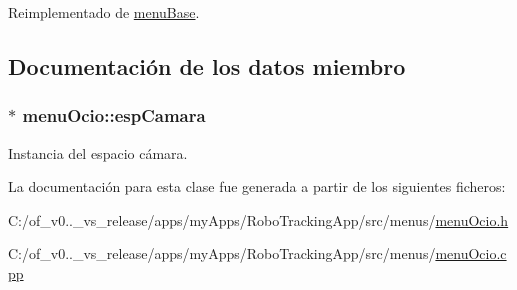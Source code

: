Reimplementado de \hyperlink{classmenu_base_a8d6e8078f62721431e095cb50bbcf40e}{menu\+Base}.



\subsection{Documentación de los datos miembro}
\hypertarget{classmenu_ocio_af1c1c7ca2a0d3f3006f30d89c8edab31}{}
\subsubsection[{esp\+Camara}]{$\ast$ menu\+Ocio\+::esp\+Camara\hspace{0.3cm}{\ttfamily [protected]}}\label{classmenu_ocio_af1c1c7ca2a0d3f3006f30d89c8edab31}


Instancia del espacio cámara. 



La documentación para esta clase fue generada a partir de los siguientes ficheros\+:\begin{DoxyCompactItemize}
\item 
C\+:/of\+\_\+v0..\+\_\+vs\+\_\+release/apps/my\+Apps/\+Robo\+Tracking\+App/src/menus/\hyperlink{menu_ocio_8h}{menu\+Ocio.\+h}\item 
C\+:/of\+\_\+v0..\+\_\+vs\+\_\+release/apps/my\+Apps/\+Robo\+Tracking\+App/src/menus/\hyperlink{menu_ocio_8cpp}{menu\+Ocio.\+cpp}\end{DoxyCompactItemize}
